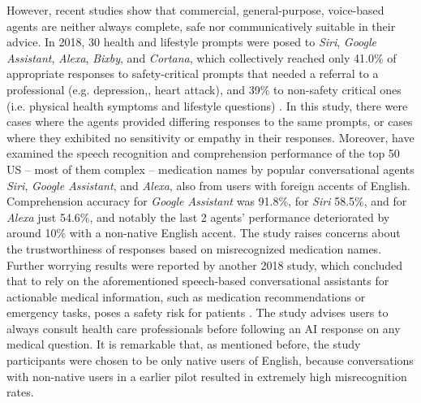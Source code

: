 However, recent studies show that commercial, general-purpose, voice-based agents are neither always complete, safe nor communicatively suitable in their advice. In 2018, 30 health and lifestyle prompts were posed to \textit{Siri}, \textit{Google Assistant}, \textit{Alexa}, \textit{Bixby}, and \textit{Cortana}, which collectively reached only 41.0\% of appropriate responses to safety-critical prompts that needed a referral to a professional (e.g. depression,, heart attack), and 39\% to non-safety critical ones (i.e. physical health symptoms and lifestyle questions) \cite{healthprompts2020}. In this study, there were cases where the agents provided differing responses to the same prompts, or cases where they exhibited no sensitivity or empathy in their responses. Moreover, \citeauthor{mouth2019} have examined the speech recognition and comprehension performance of the top 50 US -- most of them complex -- medication names by popular conversational agents \textit{Siri}, \textit{Google Assistant}, and \textit{Alexa}, also from users with foreign accents of English. Comprehension accuracy for \textit{Google Assistant} was 91.8\%, for \textit{Siri} 58.5\%, and for \textit{Alexa} just 54.6\%, and notably the last 2 agents' performance deteriorated by around 10\% with a non-native English accent. The study raises concerns about the trustworthiness of responses based on misrecognized medication names. Further worrying results were reported by another 2018 study, which concluded that to rely on the aforementioned speech-based conversational assistants for actionable medical information, such as medication recommendations or emergency tasks, poses a safety risk for patients \cite{safetyrisks2018}. The study advises users to always consult health care professionals before following an AI response on any medical question. It is remarkable that, as mentioned before, the study participants were chosen to be only native users of English, because conversations with non-native users in a earlier pilot resulted in extremely high misrecognition rates.

